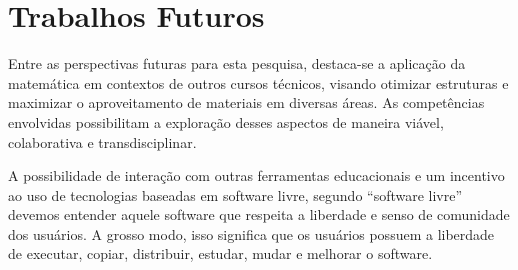 \section{Trabalhos Futuros}
\label{trabalhos_futuros}

Entre as perspectivas futuras para esta pesquisa, destaca-se a aplicação da matemática em contextos de outros cursos técnicos, visando otimizar estruturas e maximizar o aproveitamento de materiais em diversas áreas. As competências envolvidas possibilitam a exploração desses aspectos de maneira viável, colaborativa e transdisciplinar.

A possibilidade de interação com outras ferramentas educacionais e um incentivo ao uso de tecnologias baseadas em software livre, segundo  “software livre” devemos entender aquele software que respeita a liberdade e senso de comunidade dos usuários. A grosso modo, isso significa que os usuários possuem a liberdade de executar, copiar, distribuir, estudar, mudar e melhorar o software.

